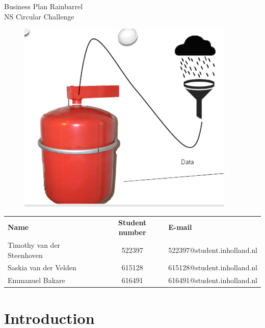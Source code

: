\documentclass[11pt]{article}
\begin{document}
		\begin{center}
		\Huge Business Plan Rainbarrel\\
		 \small NS Circular Challenge
	\end{center}
	
	\begin{figure}[H]
		\centering
		\includegraphics[width=\textwidth]{pf.png}
	\end{figure}
	
	
	\begin{table}[H]
		\begin{tabular}{l c l}
			\textbf{Name} &\textbf{Student number}& \textbf{E-mail}\\
			Timothy van der Steenhoven& 522397& 522397@student.inholland.nl \\
			Saskia van der Velden  &615128& 615128@student.inholland.nl\\
			Emmanuel Bakare &616491& 616491@student.inholland.nl\\ 
		\end{tabular}
	\end{table}
	
	\thispagestyle{empty}
	
	\newpage
	\tableofcontents
	\newpage
	
	\section*{Introduction}
	
\end{document}
